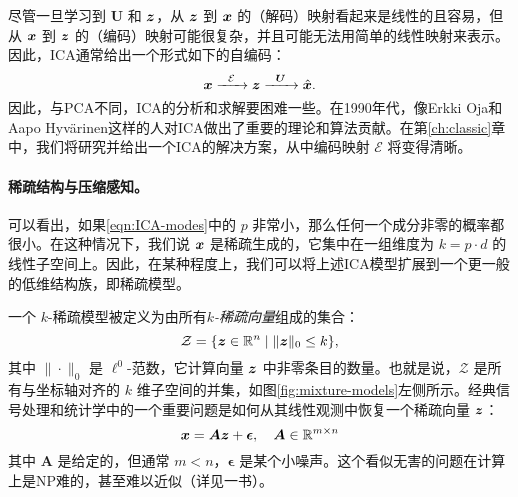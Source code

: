 \documentclass[../../book-main_zh.tex]{subfiles}
\begin{document}
尽管一旦学习到 $\boldsymbol{U}$ 和 $\bm{z}$，从 $\bm{z}$ 到 $\bm{x}$ 的（解码）映射看起来是线性的且容易，但从 $\bm{x}$ 到 $\bm{z}$ 的（编码）映射可能很复杂，并且可能无法用简单的线性映射来表示。因此，ICA通常给出一个形式如下的自编码：
\begin{equation}
    \bm{x}   \xrightarrow{\hspace{2mm} \mathcal{E}\hspace{2mm}} \bm{z}  \xrightarrow{\hspace{2mm} \boldsymbol{U} \hspace{2mm}} \hat {\bm{x}}.
       \label{eqn:auto-encoding-ICA}
\end{equation}
因此，与PCA不同，ICA的分析和求解要困难一些。在1990年代，像Erkki Oja和Aapo Hyv\"{a}rinen\cite{hyvarinen-1997,Hyvrinen-2000}这样的人对ICA做出了重要的理论和算法贡献。在第\ref{ch:classic}章中，我们将研究并给出一个ICA的解决方案，从中编码映射 $\mathcal{E}$ 将变得清晰。



\paragraph{稀疏结构与压缩感知。}
可以看出，如果\eqref{eqn:ICA-modes}中的 $p$ 非常小，那么任何一个成分非零的概率都很小。在这种情况下，我们说 $\bm{x}$ 是稀疏生成的，它集中在一组维度为 $k = p \cdot d$ 的线性子空间上。因此，在某种程度上，我们可以将上述ICA模型扩展到一个更一般的低维结构族，即稀疏模型。

一个 $k$-稀疏模型被定义为由所有{\em $k$-稀疏向量}组成的集合：
\begin{equation}
    \mathcal{Z} = \{\bm{z} \in \mathbb{R}^n \mid \|\bm{z}\|_0 \le k\},
\end{equation}
其中 $\| \cdot \|_0$ 是 $\ell^0$-范数，它计算向量 $\bm{z}$ 中非零条目的数量。也就是说，$\mathcal{Z}$ 是所有与坐标轴对齐的 $k$ 维子空间的并集，如图\ref{fig:mixture-models}左侧所示。经典信号处理和统计学中的一个重要问题是如何从其线性观测中恢复一个稀疏向量 $\bm{z}$：
\begin{equation}
    \bm{x} = \boldsymbol{A} \bm{z} + \boldsymbol{\epsilon}, \quad \boldsymbol{A} \in \mathbb{R}^{m\times n}
    \label{eqn:sparse-model}
\end{equation}
其中 $\boldsymbol{A}$ 是给定的，但通常 $m < n$，$\boldsymbol{\epsilon}$ 是某个小噪声。这个看似无害的问题在计算上是NP难的，甚至难以近似（详见\cite{Wright-Ma-2022}一书）。
\end{document}
